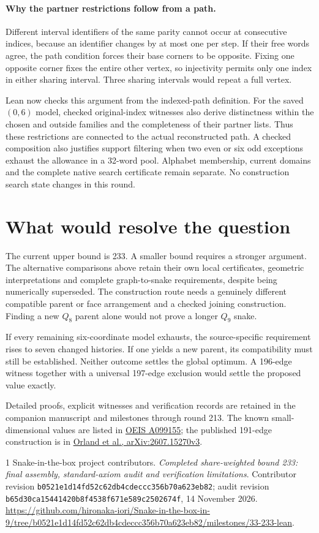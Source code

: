 \documentclass[11pt,a4paper]{article}
\begin{document}
\paragraph{Why the partner restrictions follow from a path.}
Different interval identifiers of the same parity cannot occur at
consecutive indices, because an identifier changes by at most one per
step. If their free words agree, the path condition forces their base
corners to be opposite. Fixing one opposite corner fixes the entire
other vertex, so injectivity permits only one index in either sharing
interval. Three sharing intervals would repeat a full vertex.

Lean now checks this argument from the indexed-path definition.
For the saved $(0,6)$ model, checked original-index witnesses also
derive distinctness within the chosen and outside families and the
completeness of their partner lists. Thus these restrictions are
connected to the actual reconstructed path. A checked composition
also justifies support filtering when two even or six odd exceptions
exhaust the allowance in a 32-word pool. Alphabet membership,
current domains and the complete native search certificate remain
separate. No construction search state changes in this round.

\section{What would resolve the question}
The current upper bound is 233. A smaller bound requires a stronger
argument. The alternative comparisons above retain their own local
certificates, geometric interpretations and complete graph-to-snake
requirements, despite being numerically superseded.
The construction route needs a genuinely different compatible parent
or face arrangement and a checked joining construction. Finding a new
$Q_8$ parent alone would not prove a longer $Q_9$ snake.

If every remaining six-coordinate model exhausts, the source-specific
requirement rises to seven changed histories. If one yields a new
parent, its compatibility must still be established. Neither outcome
settles the global optimum. A 196-edge witness together with a
universal 197-edge exclusion would settle the proposed value exactly.

\smallskip
{\small Detailed proofs, explicit witnesses and verification records are
retained in the companion manuscript and milestones through round 213.
The known small-dimensional values are listed in
\href{https://oeis.org/A099155}{OEIS A099155}; the published 191-edge
construction is in
\href{https://arxiv.org/html/2607.15270v3}{Orland et al., arXiv:2607.15270v3}.}
\begin{thebibliography}{1}
Snake-in-the-box project contributors. \emph{Completed share-weighted bound
233: final assembly, standard-axiom audit and verification limitations}.
Contributor revision \texttt{b0521e1d14fd52c62db4cdeccc356b70a623eb82};
audit revision \texttt{b65d30ca15441420b8f4538f671e589c2502674f},
14 November 2026.
\url{https://github.com/hironaka-iori/Snake-in-the-box-in-9/tree/b0521e1d14fd52c62db4cdeccc356b70a623eb82/milestones/33-233-lean}.

\end{thebibliography}
\end{document}
